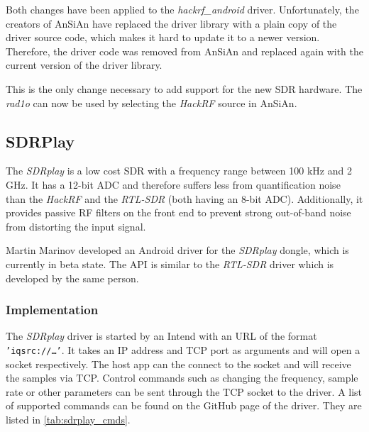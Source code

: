 Both changes have been applied to the \emph{hackrf\_android} driver. Unfortunately, the
creators of \ac{AnSiAn} have replaced the driver library with a plain copy of the driver
source code, which makes it hard to update it to a newer version. Therefore, the
driver code was removed from \ac{AnSiAn} and replaced again with the current version
of the driver library.

This is the only change necessary to add support for the new \ac{SDR} hardware. 
The \emph{rad1o} can now be used by selecting the \emph{HackRF} source in \ac{AnSiAn}.


\subsection{SDRPlay}

The \emph{SDRplay} is a low cost \ac{SDR} with a frequency range between 100 kHz and
2 GHz. It has a 12-bit \ac{ADC} and therefore suffers less from quantification noise
than the \emph{HackRF} and the \emph{RTL-SDR} (both having an 8-bit \ac{ADC}).
Additionally, it provides passive \ac{RF} filters on the front end to prevent strong
out-of-band noise from distorting the input signal.

Martin Marinov developed an Android driver for the \emph{SDRplay} dongle, which
is currently in beta state. The API is similar to the \emph{RTL-SDR} driver which is
developed by the same person.

\subsubsection{Implementation}

The \emph{SDRplay} driver is started by an Intend with an URL of the format
\texttt{'iqsrc://\ldots'}. It takes an IP address and TCP port as arguments and
will open a socket respectively. The host app can the connect to the socket and
will receive the samples via TCP. Control commands such as changing the
frequency, sample rate or other parameters can be sent through the TCP socket
to the driver. A list of supported commands can be found on the GitHub page
of the driver. They are listed in \autoref{tab:sdrplay_cmds}.


